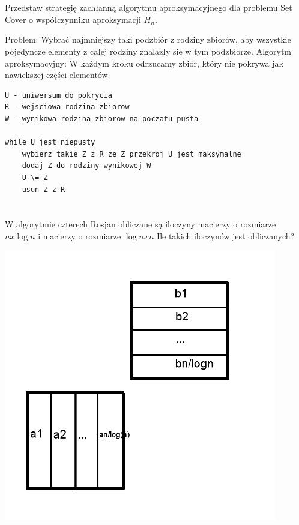 \documentclass[svgnames]{report}
\begin{document}
\section{}
\begin{framed}
Przedstaw strategię zachłanną algorytmu aproksymacyjnego dla problemu Set Cover o współczynniku aproksymacji $H_n$.
\end{framed}
Problem: Wybrać najmniejszy taki podzbiór z rodziny zbiorów, aby wszystkie pojedyncze elementy z całej rodziny znalazły sie w tym podzbiorze.
Algorytm aproksymacyjny: W każdym kroku odrzucamy zbiór, który nie pokrywa jak nawiekszej części elementów.
\begin{lstlisting}
U - uniwersum do pokrycia
R - wejsciowa rodzina zbiorow
W - wynikowa rodzina zbiorow na poczatu pusta

while U jest niepusty
    wybierz takie Z z R ze Z przekroj U jest maksymalne
    dodaj Z do rodziny wynikowej W
    U \= Z
    usun Z z R
\end{lstlisting}

\section{}
\begin{framed}
W algorytmie czterech Rosjan obliczane są iloczyny macierzy o rozmiarze $ n x \log n$ i macierzy o rozmiarze $ \log n x n$ Ile takich iloczynów jest obliczanych?
\end{framed}

\includegraphics[scale=0.55]{images/17.png}
\end{document}
